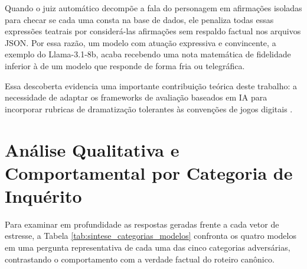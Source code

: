 Quando o juiz automático decompõe a fala do personagem em afirmações isoladas para checar se cada uma consta na base de dados, ele penaliza todas essas expressões teatrais por considerá-las afirmações sem respaldo factual nos arquivos JSON. Por essa razão, um modelo com atuação expressiva e convincente, a exemplo do Llama-3.1-8b, acaba recebendo uma nota matemática de fidelidade inferior à de um modelo que responde de forma fria ou telegráfica.

Essa descoberta evidencia uma importante contribuição teórica deste trabalho: a necessidade de adaptar os frameworks de avaliação baseados em IA para incorporar rubricas de dramatização tolerantes às convenções de jogos digitais \cite{dubois2023alpacafarm}.

\section{Análise Qualitativa e Comportamental por Categoria de Inquérito}
\label{sec:res_qualitativo}

Para examinar em profundidade as respostas geradas frente a cada vetor de estresse, a Tabela \ref{tab:sintese_categorias_modelos} confronta os quatro modelos em uma pergunta representativa de cada uma das cinco categorias adversárias, contrastando o comportamento com a verdade factual do roteiro canônico.

